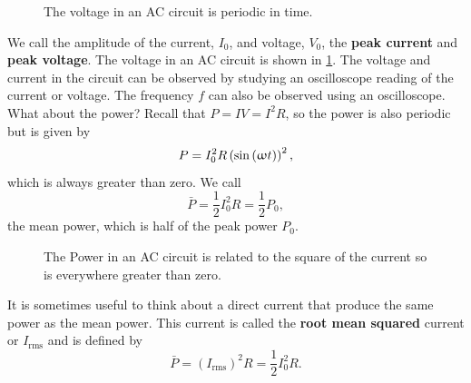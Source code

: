 \documentclass[a4paper,12pt]{book}
\begin{document}
\begin{figure}[ht]
    \centering
    \caption{The voltage in an AC circuit is periodic in time.}
        \label{fig: AC voltage}
\end{figure}

We call the amplitude of the current, $I_{0}$, and voltage, $V_{0}$, the \textbf{peak current} and \textbf{peak voltage}. The voltage in an AC circuit is shown in \cref{fig: AC voltage}. The voltage and current in the circuit can be observed by studying an oscilloscope reading of the current or voltage. The frequency $f$ can also be observed using an oscilloscope. What about the power? Recall that $P=IV=I^{2}R$, so the power is also periodic but is given by
\begin{equation*}
P=I_{0}^{2}R\left(\sin\left(\upomega t\right)\right)^{2},
\end{equation*}
which is always greater than zero. We call 
\begin{equation*}
\bar{P}=\frac{1}{2}I_{0}^{2}R=\frac{1}{2}P_{0},
\end{equation*}
the mean power, which is half of the peak power $P_{0}$.\\

\begin{figure}[ht]
    \centering
    \caption{The Power in an AC circuit is related to the square of the current so is everywhere greater than zero.}
        \label{fig: AC Power}
\end{figure}

It is sometimes useful to think about a direct current that produce the same power as the mean power. This current is called the \textbf{root mean squared} current or $I_{\text{rms}}$ and is defined by 
\begin{equation*}
\bar{P}=(I_{\text{rms}})^{2}R=\frac{1}{2}I_{0}^{2}R.
\end{equation*}
\end{document}
